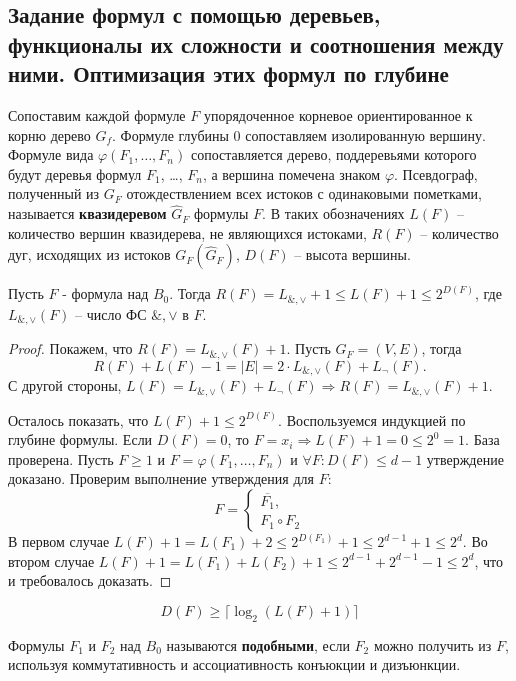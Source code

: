 \documentclass[11pt]{article}
\newcounter{th}\setcounter{th}{0}
\newcounter{cnsqnc}\setcounter{cnsqnc}{0}
\def\cnsqnc{\par\smallskip\refstepcounter{cnsqnc}\textbf{\arabic{cnsqnc}}}
\newtheorem*{Consequence}{Следствие \cnsqnc}
\newcounter{stnmt}\setcounter{stnmt}{0}
\def\st{\par\smallskip\refstepcounter{stnmt}\textbf{\arabic{stnmt}}}
\newtheorem*{Statement}{Утверждение \st}
\begin{document}
\subsection{Задание формул с помощью деревьев, функционалы их сложности и соотношения между ними. Оптимизация этих формул по глубине}
\label{sec:org1ebcd6b}
Сопоставим каждой формуле \(F\) упорядоченное корневое ориентированное к корню дерево \(G_f\).
Формуле глубины \(0\) сопоставляем изолированную вершину. Формуле вида \(\varphi(F_1, \ldots, F_n)\)
сопоставляется дерево, поддеревьями которого будут деревья формул \(F_1\), \ldots, \(F_n\), а вершина
помечена знаком \(\varphi\). Псевдограф, полученный из \(G_F\) отождествлением всех истоков с
одинаковыми пометками, называется \textbf{квазидеревом} \(\hat{G}_F\) формулы \(F\). В таких обозначениях
\(L(F)\) -- количество вершин квазидерева, не являющихся истоками, \(R(F)\) -- количество дуг,
исходящих из истоков \(G_F(\hat{G}_F)\), \(D(F)\) -- высота вершины.
\begin{Statement}
Пусть $F$ - формула над $B_0$. Тогда $R(F)  = L_{\&, \vee} + 1 \leq L(F) + 1 \leq 2^{D(F)}$,
где $L_{\&, \vee}(F)$ -- число ФС $\&, \vee$ в $F$.
\end{Statement}
\begin{proof}
Покажем, что $R(F) = L_{\&, \vee}(F) + 1$. Пусть $G_F = (V, E)$, тогда
\begin{equation}
R(F) + L(F) - 1 = |E| = 2\cdot L_{\&, \vee}(F) + L_{\neg}(F).
\end{equation}
С другой стороны, $L(F) = L_{\&, \vee}(F) + L_{\neg}(F) \Rightarrow R(F) = L_{\&, \vee}(F) + 1$.

Осталось показать, что $L(F) + 1 \leq 2^{D(F)}$. Воспользуемся индукцией по глубине формулы.
Если $D(F) = 0$, то $F = x_i \Rightarrow L(F) + 1 = 0 \leq 2^0 = 1$. База проверена.
Пусть $F \geq 1$ и $F = \varphi(F_1, \ldots, F_n)$ и $\forall F: D(F) \leq d - 1$ утверждение
доказано. Проверим выполнение утверждения для $F$:
\begin{equation}
F = \begin{cases}
\overline{F_1}, \\
F_1\circ F_2
\end{cases}
\end{equation}
В первом случае $L(F) + 1 = L(F_1) + 2 \leq 2^{D(F_1)} + 1 \leq 2^{d - 1} + 1 \leq 2^d$.
Во втором случае $L(F) + 1 = L(F_1) + L(F_2) + 1 \leq 2^{d - 1} + 2^{d - 1} - 1 \leq 2^d$, что
и требовалось доказать.
\end{proof}
\begin{Consequence}
\begin{equation*}
D(F) \geq \lceil\log_2(L(F) + 1)\rceil
\end{equation*}
\end{Consequence}
Формулы $F_1$ и $F_2$ над $B_0$ называются \textbf{подобными}, если $F_2$ можно получить из $F$,
используя коммутативность и ассоциативность конъюкции и дизъюнкции.
\end{document}
